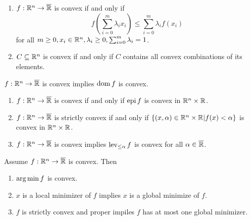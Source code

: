\begin{thm}
  \label{sec:convexity-3}
  \begin{enumerate}
  \item $f: \mathbb{R}^{n} \rightarrow \overline {\mathbb{R}}$ is convex if and only if
    \begin{equation}
      \label{eq:6}
      f(\sum_{i=0}^{m} \lambda_{i} x_{i}) \leq \sum_{i=0}^{m}
      \lambda_{i} f(x_{i})
    \end{equation} for all $m \geq 0, x_{i} \in \mathbb{R}^{n}, \lambda_{i}
    \geq 0, \sum_{i=0}^{m} \lambda_{i} = 1$.
  \item $C \subseteq \mathbb{R}^{n}$ is convex if and only if $C$ contains all
    convex combinations of its elements.
  \end{enumerate}
\end{thm}

\begin{thm}
  \label{sec:convexity-4}
  $f: \mathbb{R}^{n} \rightarrow \overline {\mathbb{R}}$ is convex implies $\operatorname*{dom} f$ is convex.
\end{thm}

\begin{thm}
  \label{sec:convexity-5}
  \begin{enumerate}
  \item $f: \mathbb{R}^{n} \rightarrow \overline {\mathbb{R}}$ is convex if and only if
    $\operatorname*{epi} f$ is convex in $\mathbb{R}^{n} \times \mathbb{R}$.
  \item $f: \mathbb{R}^{n} \rightarrow \overline {\mathbb{R}}$ is strictly convex if and only if
    $\{ (x, \alpha) \in \mathbb{R}^{n} \times \mathbb{R} | f(x) < \alpha \} $ is
    convex in $\mathbb{R}^{n} \times \mathbb{R}$.
  \item $f: \mathbb{R}^{n} \rightarrow \overline {\mathbb{R}}$ is convex implies
    $\operatorname*{lev}_{\leq \alpha} f$ is convex for all $\alpha \in \overline {\mathbb{R}}$.
  \end{enumerate}
\end{thm}

\begin{thm}
  \label{sec:convexity-7}
  Assume $f: \mathbb{R}^{n} \rightarrow \overline {\mathbb{R}}$ is convex. Then
  \begin{enumerate}
  \item $\operatorname*{arg\,min} f$ is convex.
  \item $x$ is a local minimizer of $f$ implies $x$ is a global
    minimize of $f$.
  \item $f$ is strictly convex and proper impiles $f$ has at most one
    global minimizer.
  \end{enumerate}
\end{thm}

